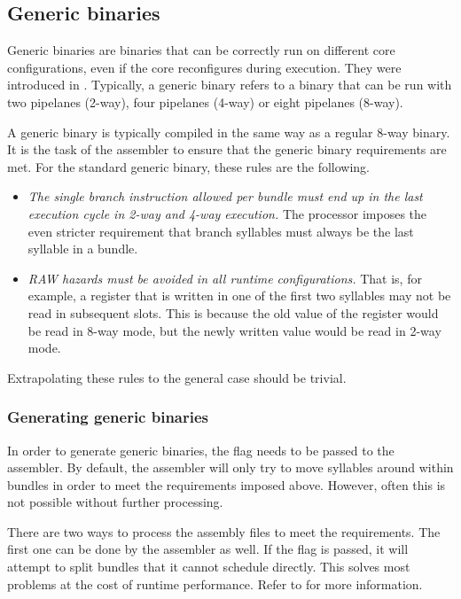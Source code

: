 
\subsection{Generic binaries}
\label{sec:core-ug-isa-gen-bin}

Generic binaries are binaries that can be correctly run on different core 
configurations, even if the core reconfigures during execution. They were 
introduced in \cite{brandon2013}. Typically, a generic binary refers to a
binary that can be run with two pipelanes (2-way), four pipelanes (4-way)
or eight pipelanes (8-way).

A generic binary is typically compiled in the same way as a regular 8-way
binary. It is the task of the assembler to ensure that the generic binary
requirements are met. For the standard generic binary, these rules are the
following.

\begin{itemize}

\item \emph{The single branch instruction allowed per bundle must end up in the 
last execution cycle in 2-way and 4-way execution.} The \rvex{} processor
imposes the even stricter requirement that branch syllables must always be the
last syllable in a bundle.

\item \emph{RAW hazards must be avoided in all runtime configurations.} That is,
for example, a register that is written in one of the first two syllables may
not be read in subsequent slots. This is because the old value of the register
would be read in 8-way mode, but the newly written value would be read in 2-way
mode.

\end{itemize}

\noindent Extrapolating these rules to the general case should be trivial.

\subsubsection{Generating generic binaries}
\label{sec:core-ug-isa-gen-gen}

In order to generate generic binaries, the  flag needs to be passed to
the assembler. By default, the assembler will only try to move syllables around
within bundles in order to meet the requirements imposed above. However, often
this is not possible without further processing.

There are two ways to process the assembly files to meet the requirements. The
first one can be done by the assembler as well. If the  flag
is passed, it will attempt to split bundles that it cannot schedule directly.
This solves most problems at the cost of runtime performance. Refer to
\cite{brandon2013} for more information.


